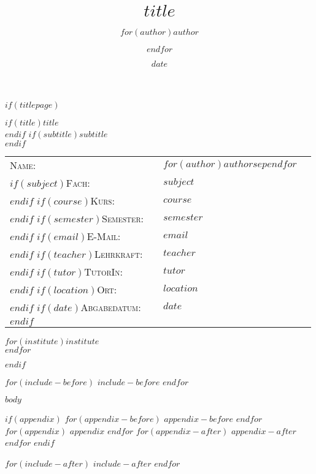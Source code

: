 \documentclass[$if(font-size)$$font-size$$else$12pt$endif$, $if(paper-format)$$paper-format$$else$a4paper$endif$]{article}
\title{$title$}
\author{$for(author)$$author$\and$endfor$}
\date{$date$}
\begin{document}
\onehalfspacing %

$if(titlepage)$
\pagestyle{plain}
\vspace*{2cm}

\begin{center}
  $if(title)${\huge $title$}\\[1cm]$endif$
  $if(subtitle)${\LARGE $subtitle$}\\[5cm]$endif$
\end{center}

\vspace*{2cm}

\begin{tabular}{p{3.5cm}|p{0.1cm} p{10cm}l}
  \textsc{Name:}                   &  & $for(author)$\textsc{$author$}$sep$\newline$endfor$ \\
  $if(subject)$\textsc{Fach:}      &  & \textsc{$subject$}                                  \\ $endif$
  $if(course)$\textsc{Kurs:}       &  & \textsc{$course$}                                   \\ $endif$
  $if(semester)$\textsc{Semester:} &  & \textsc{$semester$}                                 \\ $endif$
  $if(email)$\textsc{E-Mail:}      &  & \textsc{$email$}                                    \\ $endif$
  $if(teacher)$\textsc{Lehrkraft:} &  & \textsc{$teacher$}                                  \\ $endif$
  $if(tutor)$\textsc{TutorIn:}     &  & \textsc{$tutor$}                                    \\ $endif$
  $if(location)$\textsc{Ort:}      &  & \textsc{$location$}                                 \\ $endif$
  $if(date)$\textsc{Abgabedatum:}  &  & \textsc{$date$}                                     \\ $endif$
\end{tabular}

\vspace*{4cm}

\begin{center}
  $for(institute)$$institute$ \\$endfor$
\end{center}
\clearpage
\pagestyle{$if(pagestyle)$$pagestyle$$else$homework$endif$}
$endif$

$for(include-before)$
$include-before$
$endfor$

$body$

$if(appendix)$
$for(appendix-before)$
$appendix-before$
$endfor$
$for(appendix)$
$appendix$
$endfor$
$for(appendix-after)$
$appendix-after$
$endfor$
$endif$

$for(include-after)$
$include-after$
$endfor$
\end{document}
